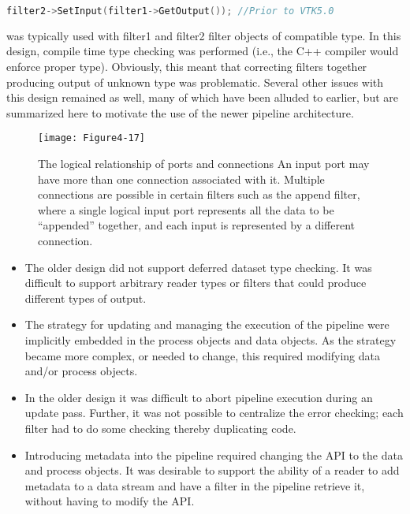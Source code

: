 \begin{lstlisting}[language=C++, caption={}, numbers=none, frame=none]
filter2->SetInput(filter1->GetOutput()); //Prior to VTK5.0
\end{lstlisting}

was typically used with filter1 and filter2 filter objects of compatible type. In this design, compile time type checking was performed (i.e., the C++ compiler would enforce proper type). Obviously, this meant that correcting filters together producing output of unknown type was problematic. Several other issues with this design remained as well, many of which have been alluded to earlier, but are summarized here to motivate the use of the newer pipeline architecture. 

\begin{figure}[!htb]
  \centering
  \texttt{[image: Figure4-17]}\\
  \caption{The logical relationship of ports and connections An input port may have more than one connection associated with it. Multiple connections are possible in certain filters such as the append filter, where a single logical input port represents all the data to be ``appended'' together, and each input is represented by a different connection.}\label{fig:Figure4-17}
\end{figure}

\begin{itemize}
\item The older design did not support deferred dataset type checking. It was difficult to support arbitrary reader types or filters that could produce different types of output.

\item The strategy for updating and managing the execution of the pipeline were implicitly embedded in the process objects and data objects. As the strategy became more complex, or needed to change, this required modifying data and/or process objects.

\item In the older design it was difficult to abort pipeline execution during an update pass. Further, it was not possible to centralize the error checking; each filter had to do some checking thereby duplicating code.

\item Introducing metadata into the pipeline required changing the API to the data and process objects. It was desirable to support the ability of a reader to add metadata to a data stream and have a filter in the pipeline retrieve it, without having to modify the API.
\end{itemize}

